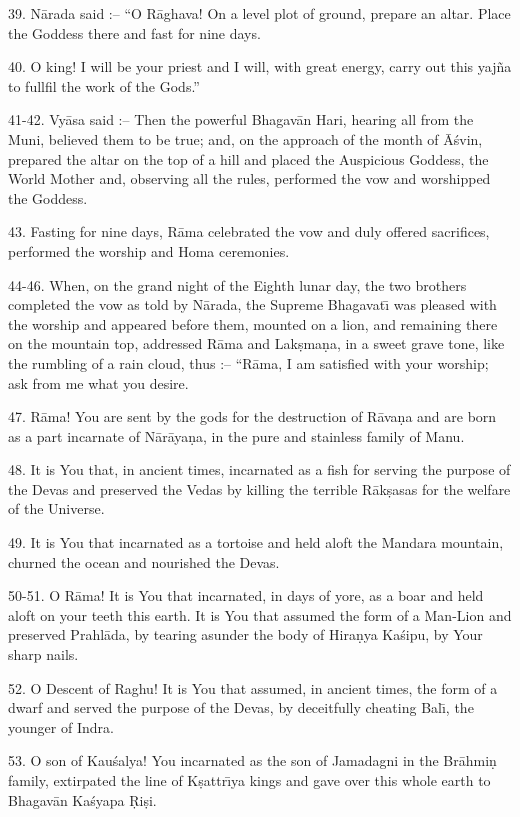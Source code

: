 39. N\=arada said :-- ``O R\=aghava! On a level plot of ground, prepare an altar. Place the Goddess there and fast for nine days.

40. O king! I will be your priest and I will, with great energy, carry out this yaj\~na to fullfil the work of the Gods.''

41-42. Vy\=asa said :-- Then the powerful Bhagav\=an Hari, hearing all from the Muni, believed them to be true; and, on the approach of the month of \=A\'svin, prepared the altar on the top of a hill and placed the Auspicious Goddess, the World Mother and, observing all the rules, performed the vow and worshipped the Goddess.

43. Fasting for nine days, R\=ama celebrated the vow and duly offered sacrifices, performed the worship and Homa ceremonies.

44-46. When, on the grand night of the Eighth lunar day, the two brothers completed the vow as told by N\=arada, the Supreme Bhagavat\={\i} was pleased with the worship and appeared before them, mounted on a lion, and remaining there on the mountain top, addressed R\=ama and Lak\d{s}ma\d{n}a, in a sweet grave tone, like the rumbling of a rain cloud, thus :-- ``R\=ama, I am satisfied with your worship; ask from me what you desire.

47. R\=ama! You are sent by the gods for the destruction of R\=ava\d{n}a and are born as a part incarnate of N\=ar\=aya\d{n}a, in the pure and stainless family of Manu.

48. It is You that, in ancient times, incarnated as a fish for serving the purpose of the Devas and preserved the Vedas by killing the terrible R\=ak\d{s}asas for the welfare of the Universe.

49. It is You that incarnated as a tortoise and held aloft the Mandara mountain, churned the ocean and nourished the Devas.

50-51. O R\=ama! It is You that incarnated, in days of yore, as a boar and held aloft on your teeth this earth. It is You that assumed the form of a Man-Lion and preserved Prahl\=ada, by tearing asunder the body of Hira\d{n}ya Ka\'sipu, by Your sharp nails.

52. O Descent of Raghu! It is You that assumed, in ancient times, the form of a dwarf and served the purpose of the Devas, by deceitfully cheating Bal\={\i}, the younger of Indra.

53. O son of Kau\'salya! You incarnated as the son of Jamadagni in the Br\=ahmi\d{n} family, extirpated the line of K\d{s}attr\={\i}ya kings and gave over this whole earth to Bhagav\=an Ka\'syapa \d{R}i\d{s}i.

